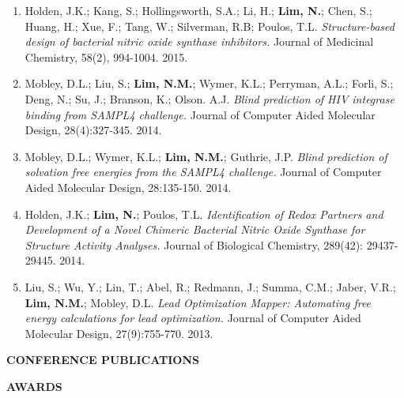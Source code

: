 {\begin{enumerate}
        \textit{Molecular Dynamics Ligand FEP Tutorial August 2015}
        Schrödinger Academy, 2015.
    \item Holden, J.K.; Kang, S.; Hollingsworth, S.A.; Li, H.; \textbf{Lim, N.}; Chen, S.; Huang, H.; Xue, F.; Tang, W.; Silverman, R.B; Poulos, T.L.
        \textit{Structure-based design of bacterial nitric oxide synthase inhibitors.}
        Journal of Medicinal Chemistry, 58(2), 994-1004. 2015.
    \item Mobley, D.L.; Liu, S.; \textbf{Lim, N.M.}; Wymer, K.L.; Perryman, A.L.; Forli, S.; Deng, N.; Su, J.; Branson, K.; Olson. A.J.
        \textit{Blind prediction of HIV integrase binding from SAMPL4 challenge.}
        Journal of Computer Aided Molecular Design, 28(4):327-345. 2014.
    \item Mobley, D.L.; Wymer, K.L.; \textbf{Lim, N.M.}; Guthrie, J.P.
        \textit{Blind prediction of solvation free energies from the SAMPL4 challenge.}
        Journal of Computer Aided Molecular Design, 28:135-150. 2014.
    \item Holden, J.K.; \textbf{Lim, N.}; Poulos, T.L.
        \textit{Identification of Redox Partners and Development of a Novel Chimeric Bacterial Nitric Oxide Synthase for Structure Activity Analyses.}
        Journal of Biological Chemistry, 289(42): 29437-29445. 2014.
    \item Liu, S.; Wu, Y.; Lin, T.; Abel, R.; Redmann, J.; Summa, C.M.; Jaber, V.R.; \textbf{Lim, N.M.}; Mobley, D.L.
        \textit{Lead Optimization Mapper: Automating free energy calculations for lead optimization.}
        Journal of Computer Aided Molecular Design, 27(9):755-770. 2013. 
\end{enumerate}

\vspace{12pt}
\textbf{CONFERENCE PUBLICATIONS}

  
\vspace{12pt}
\textbf{AWARDS}

}
